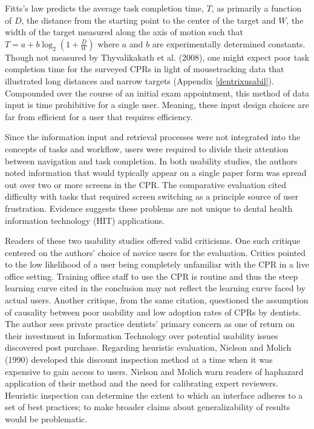 \documentclass[11pt]{article}
\begin{document}
Fitts's law \cite{Fitts:1964vn,Fitts:2012kx} predicts the average task completion time, $T$, as primarily a function of $D$, the distance from the starting point to the center of the target and $W$, the width of the target measured along the axis of motion such that $ T = a + b \log_2 \left(1 + \frac{D}{W}\right) $ where $a$ and $b$ are experimentally determined constants. Though not measured by Thyvalikakath et al. (2008), one might expect poor task completion time for the surveyed CPRs in light of mousetracking data that illustrated long distances and narrow targets (Appendix \ref{dentrixusabil}). Compounded over the course of an initial exam appointment, this method of data input is time prohibitive for a single user. Meaning, these input design choices are far from efficient for a user that requires efficiency.

Since the information input and retrieval processes were not integrated into the concepts of tasks and workflow, users were required to divide their attention between navigation and task completion. In both usability studies, the authors noted information that would typically appear on a single paper form was spread out over two or more screens in the CPR. The comparative evaluation cited difficulty with tasks that required screen switching as a principle source of user frustration. Evidence suggests these problems are not unique to dental health information technology (HIT) applications\cite{Ash2004Some-unintended,Rose2005Using-qualitati}.

Readers of these two usability studies offered valid criticisms\cite{Cockerell:2009fk}. One such critique centered on the authors' choice of novice users for the evaluation. Critics pointed to the low likelihood of a user being completely unfamiliar with the CPR in a live office setting. Training office staff to use the CPR is routine and thus the steep learning curve cited in the conclusion may not reflect the learning curve faced by actual users. Another critique, from the same citation, questioned the assumption of causality between poor usability and low adoption rates of CPRs by dentists. The author sees private practice dentists' primary concern as one of return on their investment in Information Technology over potential usability issues discovered post purchase. Regarding heuristic evaluation, Nielson and Molich (1990) developed this discount inspection method at a time when it was expensive to gain access to users. Nielson and Molich warn readers of haphazard application of their method and the need for calibrating expert reviewers. Heuristic inspection can determine the extent to which an interface adheres to a set of best practices; to make broader claims about generalizability of results would be problematic.
\end{document}
